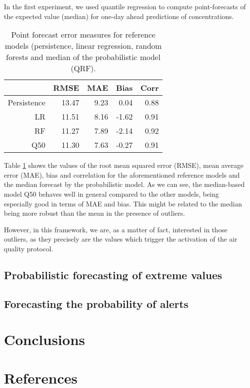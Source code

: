\documentclass[a4paper,twocolumn,5p]{elsarticle}
\begin{document}
In the first experiment, we used quantile regression to compute
point-forecasts of the expected value (median) for one-day ahead
predictions of \no concentrations.

\begin{table}[tbp]
\caption{\label{tab:determ}Point forecast error measures for reference
models (persistence, linear regression, random forests and median of
the probabilistic model (QRF).}
  \centering
\begin{tabular}{rrrrr}
  \toprule
 & RMSE & MAE & Bias & Corr \\ 
  \midrule
  Persistence & 13.47 & 9.23 & 0.04 & 0.88 \\ 
  LR   & 11.51 & 8.16 & -1.62 & 0.91 \\ 
  RF   & 11.27 & 7.89 & -2.14 & 0.92 \\
  Q50  & 11.30 & 7.63 & -0.27 & 0.91 \\ 
   \bottomrule
\end{tabular}
\end{table}

Table \ref{tab:determ} shows the values of the root mean squared error
(RMSE), mean average error (MAE), bias and correlation for the
aforementioned reference models and the median forecast by the
probabilistic model. As we can see, the median-based model Q50 behaves
well in general compared to the other models, being especially good in
terms of MAE and bias. This might be related to the median being more
robust than the mean in the presence of outliers.

However, in this framework, we are, as a matter of fact, interested in
those outliers, as they precisely are the values which trigger the
activation of the air quality protocol.


\subsection{Probabilistic forecasting of extreme values}
\label{sec:probabilistic}


\subsection{Forecasting the probability of alerts}
\label{sec:alertProb2}


\section{Conclusions}
\label{sec:concl}


\section*{References}


\end{document}
